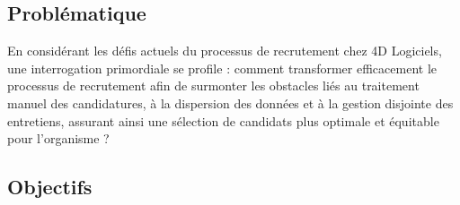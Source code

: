 \subsection{Problématique}

En considérant les défis actuels du processus de recrutement chez
 4D Logiciels, une interrogation primordiale se profile : 
 comment transformer efficacement le processus de recrutement 
 afin de surmonter les obstacles liés au traitement manuel des 
 candidatures, à la dispersion des données et à la gestion 
 disjointe des entretiens, assurant ainsi une sélection de 
 candidats plus optimale et équitable pour l'organisme ?

\subsection{Objectifs}



